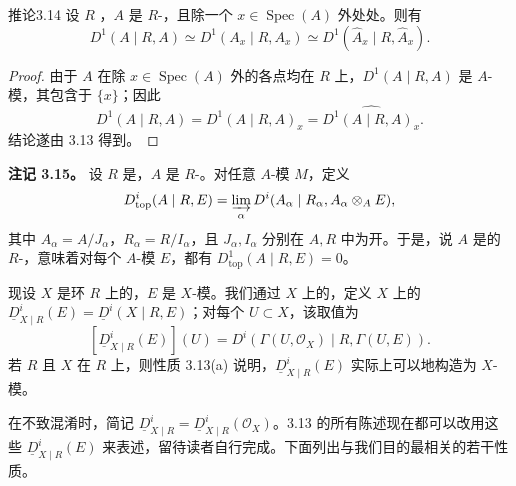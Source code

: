 \begin{SGAresult}{推论}{3.14}
设 $R$ ，$A$ 是 $R$-，且除一个 $x\in\operatorname{Spec}(A)$ 外处处。则有
\[D^1(A\mid R,A)\simeq D^1(A_x\mid R,A_x)\simeq D^1(\widehat A_x\mid R,\widehat A_x).\]
\end{SGAresult}
\begin{proof}
由于 $A$ 在除 $x\in\operatorname{Spec}(A)$ 外的各点均在 $R$ 上，$D^1(A\mid R,A)$ 是 $A$-模，其包含于 $\{x\}$；因此
\[D^1(A\mid R,A)=D^1(A\mid R,A)_x=\widehat{D^1(A\mid R,A)_x}.\]
结论遂由 3.13 得到。
\end{proof}

\textbf{注记 3.15。} 设 $R$ 是，$A$ 是 $R$-。对任意 $A$-模 $M$，定义
\[D^i_{\mathrm{top}}(A\mid R,E)=\varinjlim_{\alpha}D^i(A_\alpha\mid R_\alpha,A_\alpha\otimes_A E),\]
其中 $A_\alpha=A/J_\alpha$，$R_\alpha=R/I_\alpha$，且 $J_\alpha,I_\alpha$ 分别在 $A,R$ 中为开。于是，说 $A$ 是的 $R$-，意味着对每个 $A$-模 $E$，都有 $D^1_{\mathrm{top}}(A\mid R,E)=0$。

现设 $X$ 是环 $R$ 上的，$E$ 是 $X$-模。我们通过 $X$ 上的，定义 $X$ 上的 $\underline D^i_{X\mid R}(E)=\underline D^i(X\mid R,E)$；对每个 $U\subset X$，该取值为
\[[\underline D^i_{X\mid R}(E)](U)=D^i(\Gamma(U,\mathcal O_X)\mid R,\Gamma(U,E)).\]
若 $R$ 且 $X$ 在 $R$ 上，则性质 3.13(a) 说明，$\underline D^i_{X\mid R}(E)$ 实际上可以地构造为 $X$-模。

在不致混淆时，简记 $\underline D^i_{X\mid R}=\underline D^i_{X\mid R}(\mathcal O_X)$。3.13 的所有陈述现在都可以改用这些 $\underline D^i_{X\mid R}(E)$ 来表述，留待读者自行完成。下面列出与我们目的最相关的若干性质。

